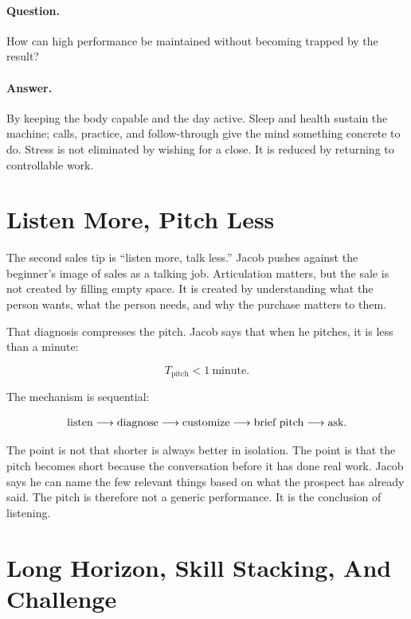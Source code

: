 \paragraph{Question.}
How can high performance be maintained without becoming trapped by the result?

\paragraph{Answer.}
By keeping the body capable and the day active. Sleep and health sustain the machine; calls, practice, and follow-through give the mind something concrete to do. Stress is not eliminated by wishing for a close. It is reduced by returning to controllable work.

\section{Listen More, Pitch Less}

The second sales tip is ``listen more, talk less.'' Jacob pushes against the beginner's image of sales as a talking job. Articulation matters, but the sale is not created by filling empty space. It is created by understanding what the person wants, what the person needs, and why the purchase matters to them.

That diagnosis compresses the pitch. Jacob says that when he pitches, it is less than a minute:

\begin{equation}
T_{\mathrm{pitch}} < 1\ \mathrm{minute}.
\end{equation}

The mechanism is sequential:

\begin{equation}
\hbox{listen}
\longrightarrow
\hbox{diagnose}
\longrightarrow
\hbox{customize}
\longrightarrow
\hbox{brief pitch}
\longrightarrow
\hbox{ask}.
\end{equation}

The point is not that shorter is always better in isolation. The point is that the pitch becomes short because the conversation before it has done real work. Jacob says he can name the few relevant things based on what the prospect has already said. The pitch is therefore not a generic performance. It is the conclusion of listening.

\section{Long Horizon, Skill Stacking, And Challenge}

